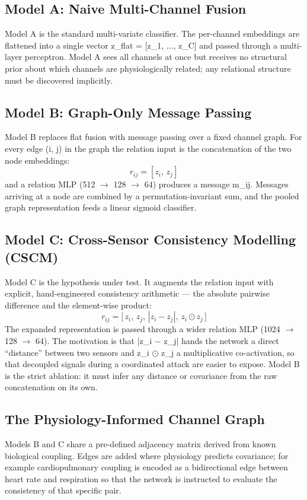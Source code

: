 \documentclass[conference]{IEEEtran}
\begin{document}
\subsection{Model A: Naive Multi-Channel Fusion}
Model A is the standard multi-variate classifier. The per-channel embeddings are flattened into a single vector z\_flat = [z\_1, $\ldots$, z\_C] and passed through a multi-layer perceptron. Model A sees all channels at once but receives no structural prior about which channels are physiologically related; any relational structure must be discovered implicitly.
\subsection{Model B: Graph-Only Message Passing}
Model B replaces flat fusion with message passing \cite{gilmer2017} over a fixed channel graph. For every edge (i, j) in the graph the relation input is the concatenation of the two node embeddings:
\begin{equation}
r_{ij} = [z_i ,\, z_j]
\end{equation}
and a relation MLP (512 $\rightarrow$ 128 $\rightarrow$ 64) produces a message m\_ij. Messages arriving at a node are combined by a permutation-invariant sum, and the pooled graph representation feeds a linear sigmoid classifier.
\subsection{Model C: Cross-Sensor Consistency Modelling (CSCM)}
Model C is the hypothesis under test. It augments the relation input with explicit, hand-engineered consistency arithmetic --- the absolute pairwise difference and the element-wise product:
\begin{equation}
r_{ij} = \big[\, z_i ,\, z_j ,\, |z_i - z_j| ,\, z_i \odot z_j \,\big]
\end{equation}
The expanded representation is passed through a wider relation MLP (1024 $\rightarrow$ 128 $\rightarrow$ 64). The motivation is that |z\_i $-$ z\_j| hands the network a direct ``distance'' between two sensors and z\_i $\odot$ z\_j a multiplicative co-activation, so that decoupled signals during a coordinated attack are easier to expose. Model B is the strict ablation: it must infer any distance or covariance from the raw concatenation on its own.
\subsection{The Physiology-Informed Channel Graph}
Models B and C share a pre-defined adjacency matrix derived from known biological coupling. Edges are added where physiology predicts covariance; for example cardiopulmonary coupling is encoded as a bidirectional edge between heart rate and respiration so that the network is instructed to evaluate the consistency of that specific pair.
\end{document}
